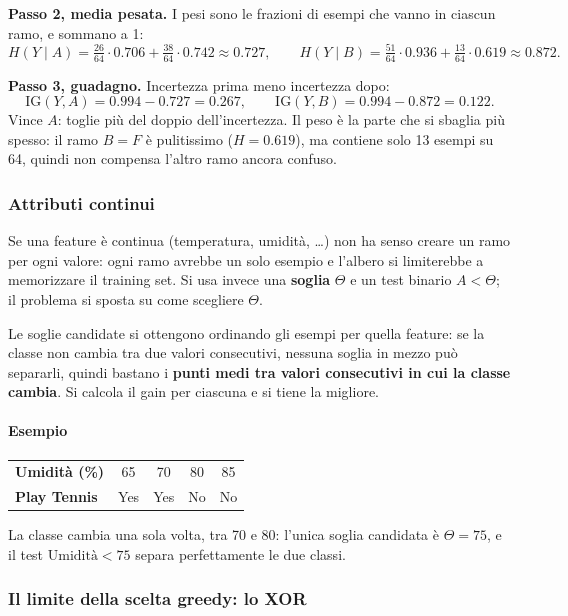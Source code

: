 \documentclass[12pt]{extarticle}
\begin{document}
\noindent\textbf{Passo 2, media pesata.} I pesi sono le frazioni di esempi che vanno in ciascun ramo, e sommano a 1:
\[
H(Y \mid A) = \tfrac{26}{64}\cdot 0.706 + \tfrac{38}{64}\cdot 0.742 \approx 0.727,
\qquad
H(Y \mid B) = \tfrac{51}{64}\cdot 0.936 + \tfrac{13}{64}\cdot 0.619 \approx 0.872.
\]

\noindent\textbf{Passo 3, guadagno.} Incertezza prima meno incertezza dopo:
\[
\mathrm{IG}(Y,A) = 0.994 - 0.727 = \mathbf{0.267},
\qquad
\mathrm{IG}(Y,B) = 0.994 - 0.872 = 0.122.
\]
Vince $A$: toglie più del doppio dell'incertezza. Il peso è la parte che si sbaglia più spesso: il ramo $B=F$ è pulitissimo ($H=0.619$), ma contiene solo 13 esempi su 64, quindi non compensa l'altro ramo ancora confuso.

\subsubsection{Attributi continui}

\noindent Se una feature è continua (temperatura, umidità, \dots) non ha senso creare un ramo per ogni valore: ogni ramo avrebbe un solo esempio e l'albero si limiterebbe a memorizzare il training set. Si usa invece una \textbf{soglia} $\Theta$ e un test binario $A < \Theta$; il problema si sposta su come scegliere $\Theta$.

\noindent Le soglie candidate si ottengono ordinando gli esempi per quella feature: se la classe non cambia tra due valori consecutivi, nessuna soglia in mezzo può separarli, quindi bastano i \textbf{punti medi tra valori consecutivi in cui la classe cambia}. Si calcola il gain per ciascuna e si tiene la migliore.

\paragraph{Esempio}
\begin{center}
\small
\begin{tabular}{lcccc}
    \toprule
    \textbf{Umidità (\%)} & 65 & 70 & 80 & 85 \\
    \textbf{Play Tennis} & Yes & Yes & No & No \\
    \bottomrule
\end{tabular}
\end{center}
La classe cambia una sola volta, tra 70 e 80: l'unica soglia candidata è $\Theta = 75$, e il test $\text{Umidità} < 75$ separa perfettamente le due classi.

\subsubsection{Il limite della scelta greedy: lo XOR}
\end{document}
